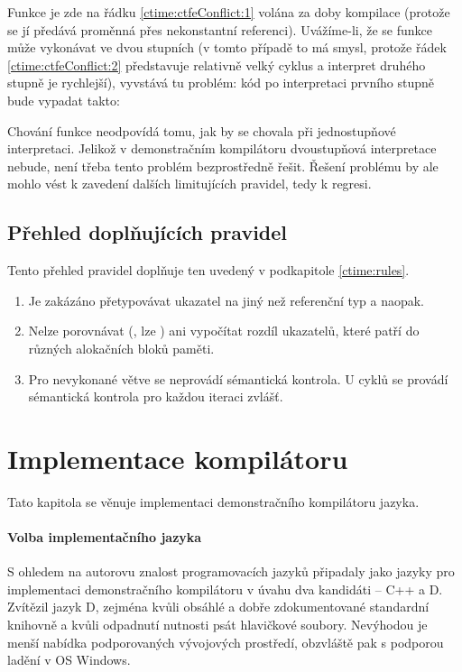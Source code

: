 Funkce  je zde na řádku \ref{ctime:ctfeConflict:1} volána za doby kompilace (protože se jí předává \ctime proměnná přes nekonstantní referenci). Uvážíme-li, že se funkce může vykonávat ve dvou stupních (v tomto případě to má smysl, protože řádek \ref{ctime:ctfeConflict:2} představuje relativně velký cyklus a interpret druhého stupně je rychlejší), vyvstává tu problém: kód po interpretaci prvního stupně bude vypadat takto:
\begin{code}
Void foo( Int!? x ) {
	@ctime while( y < 4 ) {
		while( x < 10000 )
			x++;
		// y = 1
		
		while( x < 10000 )
			x++;
		// y = 2
		
		while( x < 10000 )
			x++;
		// y = 3
	}
\end{code}

Chování funkce neodpovídá tomu, jak by se chovala při jednostupňové interpretaci. Jelikož v demonstračním kompilátoru dvoustupňová interpretace nebude, není třeba tento problém bezprostředně řešit. Řešení problému by ale mohlo vést k zavedení dalších limitujících pravidel, tedy k regresi.

\section{Přehled doplňujících pravidel} \label{ctime:moreRules}
Tento přehled pravidel doplňuje ten uvedený v podkapitole \ref{ctime:rules}.

\begin{enumerate}
	\item Je zakázáno přetypovávat \ctime ukazatel na jiný než referenční \ctime typ a naopak.
	\item Nelze porovnávat (\inlineCode{< > <= >=}, lze ) ani vypočítat rozdíl \ctime ukazatelů, které patří do různých alokačních bloků paměti.
	\item Pro nevykonané \ctime větve se neprovádí sémantická kontrola. U \ctime cyklů se provádí sémantická kontrola pro každou iteraci zvlášť.
\end{enumerate}

\chapter{Implementace kompilátoru}
Tato kapitola se věnuje implementaci demonstračního kompilátoru jazyka.

\subsubsection{Volba implementačního jazyka}
S ohledem na autorovu znalost programovacích jazyků připadaly jako jazyky pro implementaci demonstračního kompilátoru v úvahu dva kandidáti -- C++ a D. Zvítězil jazyk D, zejména kvůli obsáhlé a dobře zdokumentované standardní knihovně a kvůli odpadnutí nutnosti psát hlavičkové soubory. Nevýhodou je menší nabídka podporovaných vývojových prostředí, obzvláště pak s podporou ladění v OS Windows.

